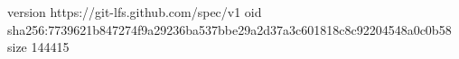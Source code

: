 version https://git-lfs.github.com/spec/v1
oid sha256:7739621b847274f9a29236ba537bbe29a2d37a3c601818c8c92204548a0c0b58
size 144415

